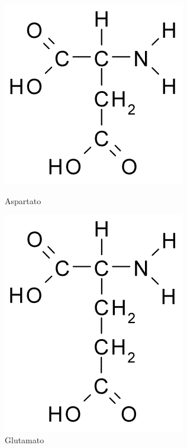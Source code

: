 \documentclass[a4paper,12pt]{article}
\begin{document}
 	\begin{figure}[H]
 		\begin{center}
 			\begin{minipage}{0.45\linewidth}
 				\centering   
 				\includegraphics[width=0.5\linewidth]{asparticacid.png}	
 				\caption{Aspartato}
 				\label{fig:asparticacid}
 			\end{minipage}
 			\begin{minipage}{0.45\linewidth}
 				\centering   
 				\includegraphics[width=0.45\linewidth]{glutamicacid.png}
 				\caption{Glutamato}
 				\label{fig:glutamicacid}
 			\end{minipage}
 		\end{center}
 	\end{figure}
 
 	
\end{document}
